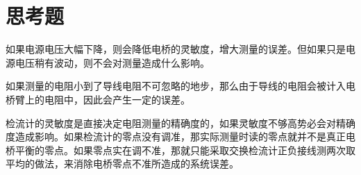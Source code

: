 \documentclass[UTF8]{ctexart}
\begin{document}
\section{思考题}
如果电源电压大幅下降，则会降低电桥的灵敏度，增大测量的误差。但如果只是电源电压稍有波动，则不会对测量造成什么影响。

如果测量的电阻小到了导线电阻不可忽略的地步，那么由于导线的电阻会被计入电桥臂上的电阻中，因此会产生一定的误差。

检流计的灵敏度是直接决定电阻测量的精确度的，如果灵敏度不够高势必会对精确度造成影响。如果检流计的零点没有调准，那实际测量时读的零点就并不是真正电桥平衡的零点。如果零点实在调不准，那就只能采取交换检流计正负接线测两次取平均的做法，来消除电桥零点不准所造成的系统误差。
\end{document}
